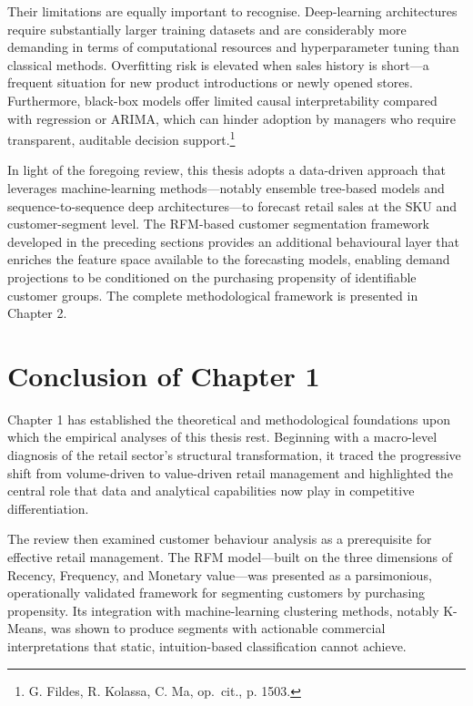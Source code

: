 Their limitations are equally important to recognise. Deep-learning
architectures require substantially larger training datasets and are
considerably more demanding in terms of computational resources and
hyperparameter tuning than classical methods. Overfitting risk is elevated
when sales history is short—a frequent situation for new product introductions
or newly opened stores. Furthermore, black-box models offer limited causal
interpretability compared with regression or ARIMA, which can hinder adoption
by managers who require transparent, auditable decision
support.\footnote{G. Fildes, R. Kolassa, C. Ma, op.\ cit., p. 1503.}

In light of the foregoing review, this thesis adopts a data-driven approach
that leverages machine-learning methods—notably ensemble tree-based models
and sequence-to-sequence deep architectures—to forecast retail sales at the
SKU and customer-segment level. The RFM-based customer segmentation
framework developed in the preceding sections provides an additional
behavioural layer that enriches the feature space available to the
forecasting models, enabling demand projections to be conditioned on the
purchasing propensity of identifiable customer groups. The complete
methodological framework is presented in Chapter 2.



\section*{Conclusion of Chapter 1}

\label{sec:conclusion_ch1}

Chapter 1 has established the theoretical and methodological foundations
upon which the empirical analyses of this thesis rest. Beginning with a
macro-level diagnosis of the retail sector's structural transformation, it
traced the progressive shift from volume-driven to value-driven retail
management and highlighted the central role that data and analytical
capabilities now play in competitive differentiation.

The review then examined customer behaviour analysis as a prerequisite for
effective retail management. The RFM model—built on the three dimensions of
Recency, Frequency, and Monetary value—was presented as a parsimonious,
operationally validated framework for segmenting customers by purchasing
propensity. Its integration with machine-learning clustering methods, notably
K-Means, was shown to produce segments with actionable commercial
interpretations that static, intuition-based classification cannot achieve.

